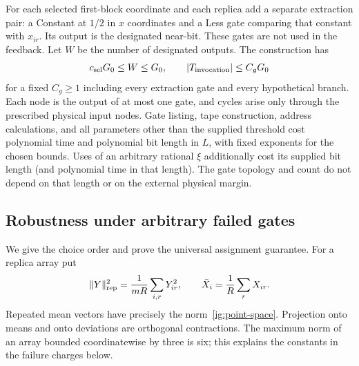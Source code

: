 For each selected first-block coordinate and each replica add a separate
extraction pair: a Constant at $1/2$ in $x$ coordinates and a Less gate
comparing that constant with $x_{ir}$. Its output is the designated
near-bit. These gates are not used in the feedback. Let $W$ be the number
of designated outputs. The construction has
\begin{equation}\label{ig:gate-count}
 c_{\rm sel}G_0\le W\le G_0,
 \qquad |T_{\rm invocation}|\le C_gG_0
\end{equation}
for a fixed $C_g\ge1$ including every extraction gate and every hypothetical
branch. Each node is the output of at most one gate, and cycles arise only
through the prescribed physical input nodes. Gate listing, tape
construction, address calculations, and all parameters other than the
supplied threshold cost polynomial time and polynomial bit length in
$L$, with fixed exponents for the chosen bounds. Uses of an arbitrary
rational $\xi$ additionally cost its supplied bit length (and polynomial
time in that length). The gate topology and count do not depend on that
length or on the external physical margin.

\subsection{Robustness under arbitrary failed gates}

We give the choice order and prove the universal assignment guarantee.
For a replica array put
\begin{equation}\label{ig:replica-norm}
 \|Y\|_{\rm rep}^2=\frac1{mR}\sum_{i,r}Y_{ir}^2,
 \qquad \bar X_i=\frac1R\sum_rX_{ir}.
\end{equation}
Repeated mean vectors have precisely the norm~\eqref{ig:point-space}.
Projection onto means and onto deviations are orthogonal contractions.
The maximum norm of an array bounded coordinatewise by three is six;
this explains the constants in the failure charges below.

